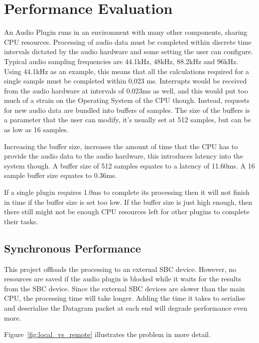 \section{Performance Evaluation}

An Audio Plugin runs in an environment with many other components, sharing CPU resources. Processing of audio data must be completed within discrete time intervals dictated by the audio hardware and some setting the user can configure. Typical audio sampling frequencies are 44.1kHz, 48kHz, 88.2kHz and 96kHz. Using 44.1kHz as an example, this means that all the calculations required for a single sample must be completed within 0,023 ms. Interrupts would be received from the audio hardware at intervals of 0.023ms as well, and this would put too much of a strain on the Operating System of the CPU though. Instead, requests for new audio data are bundled into buffers of samples. The size of the buffers is a parameter that the user can modify, it's usually set at 512 samples, but can be as low as 16 samples.

Increasing the buffer size, increases the amount of time that the CPU has to provide the audio data to the audio hardware, this introduces latency into the system though. A buffer size of 512 samples equates to a latency of 11.60ms. A 16 sample buffer size equates to 0.36ms.

If a single plugin requires 1.0ms to complete its processing then it will not finish in time if the buffer size is set too low. If the buffer size is just high enough, then there still might not be enough CPU resources left for other plugins to complete their tasks.

\subsection{Synchronous Performance}

This project offloads the processing to an external SBC device. However, no resources are saved if the audio plugin is blocked while it waits for the results from the SBC device. Since the external SBC devices are slower than the main CPU, the processing time will take longer. Adding the time it takes to serialise and deserialise the Datagram packet at each end will degrade performance even more.

Figure~\ref{fig:local_vs_remote} illustrates the problem in more detail.

